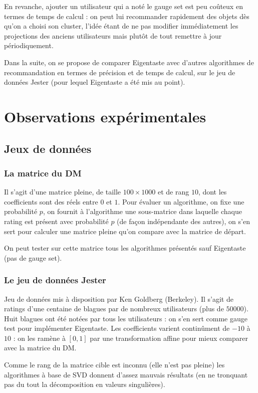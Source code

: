 \documentclass[11pt, openany, a4paper]{article}
\begin{document}
		En revanche, ajouter un utilisateur qui a noté le gauge set est peu coûteux en termes de temps de calcul : on peut lui recommander rapidement des objets dès qu'on a choisi son cluster, l'idée étant de ne pas modifier immédiatement les projections des anciens utilisateurs mais plutôt de tout remettre à jour périodiquement.
		
		Dans la suite, on se propose de comparer Eigentaste avec d'autres algorithmes de recommandation en termes de précision et de temps de calcul, sur le jeu de données Jester (pour lequel Eigentaste a été mis au point).
		
		
		
		
\section{Observations expérimentales}
	\subsection{Jeux de données}
	\subsubsection{La matrice du DM}
		
		Il s'agit d'une matrice pleine, de taille $100 \times 1000$ et de rang $10$, dont les coefficients sont des réels entre $0$ et $1$. Pour évaluer un algorithme, on fixe une probabilité $p$, on fournit à l'algorithme une sous-matrice dans laquelle chaque rating est présent avec probabilité $p$ (de façon indépendante des autres), on s'en sert pour calculer une matrice pleine qu'on compare avec la matrice de départ.
		
		On peut tester sur cette matrice tous les algorithmes présentés sauf Eigentaste (pas de gauge set).
		
	\subsubsection{Le jeu de données Jester}
		Jeu de données mis à disposition par Ken Goldberg (Berkeley). Il s'agit de ratings d'une centaine de blagues par de nombreux utilisateurs (plus de $50 000$). Huit blagues ont été notées par tous les utilisateurs : on s'en sert comme gauge test pour implémenter Eigentaste. Les coefficients varient continûment de $-10$ à $10$ : on les ramène à $[0,1]$ par une transformation affine pour mieux comparer avec la matrice du DM.
		
		Comme le rang de la matrice cible est inconnu (elle n'est pas pleine) les algorithmes à base de SVD donnent d'assez mauvais résultats (en ne tronquant pas du tout la décomposition en valeurs singulières).
		
\end{document}
